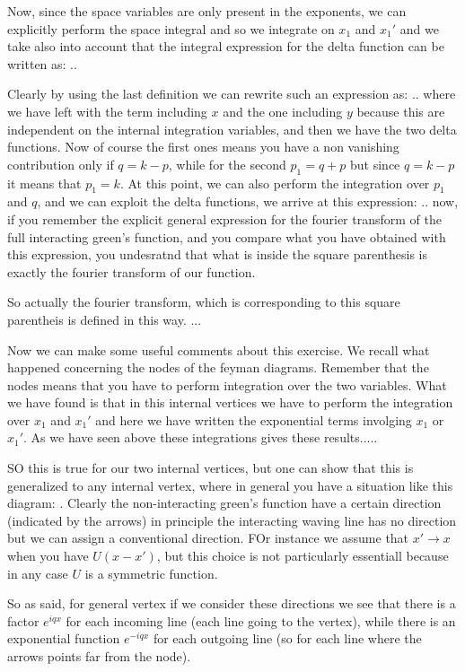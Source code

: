 \documentclass[../main/main.tex]{subfiles}
\begin{document}
Now, since the space variables are only present in the exponents, we can explicitly perform the space integral and so we integrate on \( x_1 \) and \( x_1' \) and we take also into account that the integral expression for the delta function can be written as:
..

Clearly by using the last definition we can rewrite such an expression as:
..
where we have left with the term including \( x \) and the one including \( y \) because this are independent on the internal integration variables, and then we have the two delta functions.
Now of course the first ones means you have a non vanishing contribution only if \( q=k-p \), while for the second \( p_1=q+p \) but since \( q=k-p \) it means that \( p_1=k \).
At this point, we can also perform the integration over \( p_1 \) and \( q \), and we can exploit the delta functions, we arrive at this expression:
..
now, if you remember the explicit general expression for the fourier transform of the full interacting green's function, and you compare what you have obtained with this expression, you undesratnd that what is inside the square parenthesis is exactly the fourier transform of our function.

So actually the fourier transform, which is corresponding to this square parentheis is defined in this way.
...

Now we can make some useful comments about this exercise. We recall what happened concerning the nodes of the feyman diagrams. Remember that the nodes means that you have to perform integration over the two variables. What we have found is that in this internal vertices we have to perform the integration over \( x_1 \) and \( x_1' \) and here we have written the exponential terms involging \( x_1 \) or \( x_1' \). As we have seen above these integrations gives these results.....

SO this is true for our two internal vertices, but one can show that this is generalized to any internal vertex, where in general you have a situation like this diagram:
.
Clearly the non-interacting green's function have a certain direction (indicated by the arrows) in principle the interacting waving line has no direction but we can assign a conventional direction. FOr instance we assume that \( x' \rightarrow x \) when you have \( U(x-x') \), but this choice is not particularly essentiall because in any case \( U \) is a symmetric function.

So as said, for general vertex if we consider these directions we see that there is a factor \( e^{iqx}  \) for each incoming line (each line going to the vertex), while there is an exponential function \( e^{-iqx}  \) for each outgoing line (so for each line where the arrows points far from the node).
\end{document}
